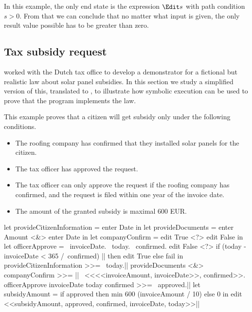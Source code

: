 In this example, the only end state is the expression $\Edit s$ with path condition $s > 0$.
From that we can conclude that no matter what input is given, the only result value possible has to be greater than zero.



\subsection{Tax subsidy request}

\citet{conf/sfp/StutterheimAP17} worked with the Dutch tax office to develop a demonstrator for a fictional but realistic law about solar panel subsidies.
In this section we study a simplified version of this, translated to \TOPHAT, to illustrate how symbolic execution can be used to prove that the program implements the law.

This example proves that a citizen will get subsidy only under the following conditions.
\begin{itemize}
\item The roofing company has confirmed that they installed solar panels for the citizen.
\item The tax officer has approved the request.
\item The tax officer can only approve the request if the roofing company has confirmed, and the request is filed within one year of the invoice date.
\item The amount of the granted subsidy is maximal 600 EUR.
\end{itemize}

\begin{TASK}[float=ht
            ,numbers=right
            ,caption=Subsidy request and approval workflow at the Dutch tax office.
            ,label=lst:tax
            ]
  let provideCitizenInformation = enter Date in
  let provideDocuments = enter Amount <&> enter Date in
  let companyConfirm = edit True <?> edit False in
  let officerApprove = \ invoiceDate. \ today. \ confirmed.
    edit False <?> if (today - invoiceDate < 365 /\ confirmed) |\label{lst:tax:officer-approve-def}|
      then edit True
      else fail in
  provideCitizenInformation >>= \ today.|\label{lst:tax:citizen-info}|
  provideDocuments <&> companyConfirm >>= |\label{lst:tax:documents-and-company-confirm}|
    \ <<<<invoiceAmount, invoiceDate>>, confirmed>>.
  officerApprove invoiceDate today confirmed >>= \ approved.|\label{lst:tax:officer-approve}|
  let subsidyAmount = if approved
    then min 600 (invoiceAmount / 10) else 0 in
  edit <<subsidyAmount, approved, confirmed, invoiceDate, today>>|\label{lst:tax:result}|
\end{TASK}

